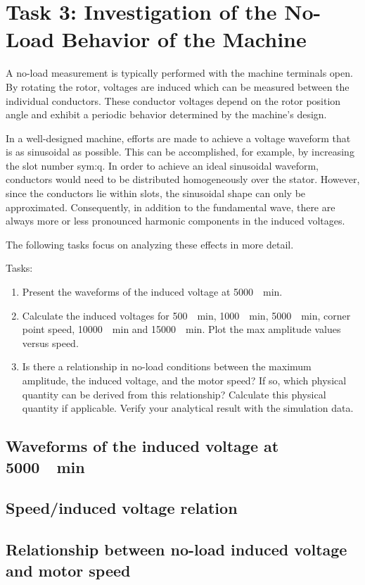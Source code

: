%
%

\chapter{Task 3: Investigation of the No-Load Behavior of the Machine}

A no-load measurement is typically performed with the machine terminals open. By rotating the rotor, voltages are induced which can be measured between the individual conductors. These conductor voltages depend on the rotor position angle and exhibit a periodic behavior determined by the machine’s design. 

In a well-designed machine, efforts are made to achieve a voltage waveform that is as sinusoidal as possible. This can be accomplished, for example, by increasing the slot number \gls{sym:q}. In order to achieve an ideal sinusoidal waveform, conductors would need to be distributed homogeneously over the stator. However, since the conductors lie within slots, the sinusoidal shape can only be approximated. Consequently, in addition to the fundamental wave, there are always more or less pronounced harmonic components in the induced voltages.

The following tasks focus on analyzing these effects in more detail.

\bigskip

Tasks:
\begin{enumerate}
	\item Present the waveforms of the induced voltage at \SI{5000}{\per\minute}.
	\item Calculate the induced voltages for \SI{500}{\per\minute}, \SI{1000}{\per\minute}, \SI{5000}{\per\minute}, corner point speed, \SI{10000}{\per\minute} and \SI{15000}{\per\minute}. Plot the max amplitude values versus speed.
	\item Is there a relationship in no-load conditions between the maximum amplitude, the induced voltage, and the motor speed? If so, which physical quantity can be derived from this relationship? Calculate this physical quantity if applicable. Verify your analytical result with the simulation data.
\end{enumerate}

\newpage

\section{Waveforms of the induced voltage at \SI{5000}{\per\minute}}

\section{Speed/induced voltage relation}

\section{Relationship between no-load induced voltage and  motor speed}

\newpage